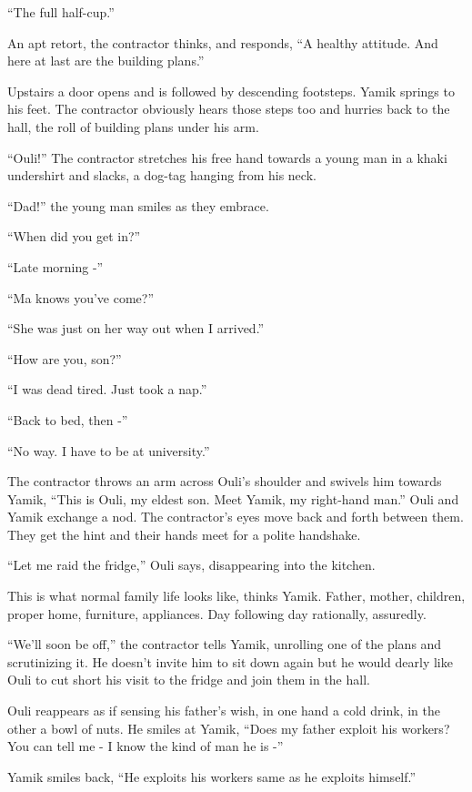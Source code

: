 \documentclass[twoside,11pt]{book}
\begin{document}
``The full half-cup.''

An apt retort, the contractor thinks, and responds, ``A healthy attitude. And here at last are the
building plans.''

Upstairs a door opens and is followed by descending footsteps. Yamik springs to his feet. The contractor obviously hears
those steps too and hurries back to the hall, the roll of building plans under his arm.

``Ouli!'' The contractor stretches his free hand towards a young man in a khaki undershirt
 and slacks, a dog-tag hanging from his neck.

``Dad!'' the young man smiles as they embrace.

``When did you get in?''

``Late morning -''

``Ma knows you've come?''

``She was just on her way out when I arrived.''

``How are you, son?''

``I was dead tired. Just took a nap.''

``Back to bed, then -''

``No way. I have to be at university.''

The contractor throws an arm across Ouli's shoulder and swivels him towards Yamik, ``This is Ouli, my
eldest son. Meet Yamik, my right-hand man.'' Ouli and Yamik exchange a nod. The contractor's eyes move
back and forth between them. They get the hint and their hands meet for a polite handshake.

``Let me raid the fridge,'' Ouli says, disappearing into the kitchen.

This is what normal family life looks like, thinks Yamik. Father, mother, children, proper home, furniture, appliances.
Day following day rationally, assuredly.

``We'll soon be off,'' the contractor tells Yamik, unrolling one of the plans and scrutinizing
it. He doesn't invite him to sit down again but he would dearly like Ouli to cut short his visit to the fridge and join
them in the hall.

Ouli reappears as if sensing his father's wish, in one hand a cold drink, in the other a bowl of nuts. He smiles at
Yamik, ``Does my father exploit his workers? You can tell me - I know the kind of man he is
-''

Yamik smiles back, ``He exploits his workers same as he exploits himself.''
\end{document}
